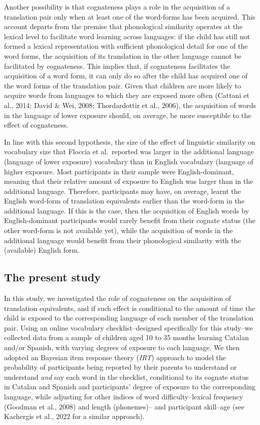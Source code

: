 \documentclass[
  letterpaper,
  DIV=11,
  numbers=noendperiod]{scrartcl}
\begin{document}
Another possibility is that cognateness plays a role in the acquisition
of a translation pair only when at least one of the word-forms has been
acquired. This account departs from the premise that phonological
similarity operates at the lexical level to facilitate word learning
across languages: if the child has still not formed a lexical
representation with sufficient phonological detail for one of the word
forms, the acquisition of its translation in the other language cannot
be facilitated by cognateness. This implies that, if cognateness
facilitates the acquisition of a word form, it can only do so after the
child has acquired one of the word forms of the translation pair. Given
that children are more likely to acquire words from languages to which
they are exposed more often (Cattani et al., 2014; David \& Wei, 2008;
Thordardottir et al., 2006), the acquisition of words in the language of
lower exposure should, on average, be more susceptible to the effect of
cognateness.

In line with this second hypothesis, the size of the effect of
linguistic similarity on vocabulary size that Floccia et al.~reported
was larger in the additional language (language of lower exposure)
vocabulary than in English vocabulary (language of higher exposure. Most
participants in their sample were English-dominant, meaning that their
relative amount of exposure to English was larger than in the additional
language. Therefore, participants may have, on average, learnt the
English word-form of translation equivalents earlier than the word-form
in the additional language. If this is the case, then the acquisition of
English words by English-dominant participants would rarely benefit from
their cognate status (the other word-form is not available yet), while
the acquisition of words in the additional language would benefit from
their phonological similarity with the (available) English form.

\hypertarget{the-present-study}{%
\subsection{The present study}\label{the-present-study}}

In this study, we investigated the role of cognateness on the
acquisition of translation equivalents, and if such effect is
conditional to the amount of time the child is exposed to the
corresponding language of each member of the translation pair. Using an
online vocabulary checklist--designed specifically for this study--we
collected data from a sample of children aged 10 to 35 months learning
Catalan and/or Spanish, with varying degrees of exposure to each
language. We then adopted an Bayesian item response theory (\emph{IRT})
approach to model the probability of participants being reported by
their parents to understand or understand \emph{and} say each word in
the checklist, conditional to its cognate status in Catalan and Spanish
and participants' degree of exposure to the corresponding language,
while adjusting for other indices of word difficulty--lexical frequency
(Goodman et al., 2008) and length (phonemes)-- and participant
skill--age (see Kachergis et al., 2022 for a similar approach).
\end{document}

